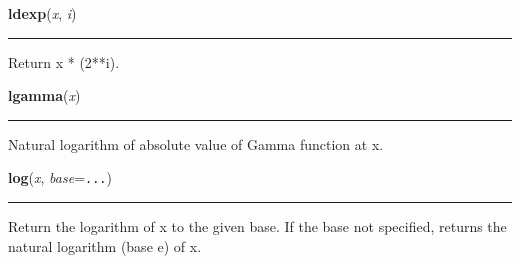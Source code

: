     \label{math:ldexp}

    \vspace{0.5ex}

\hspace{.8\funcindent}\begin{boxedminipage}{\funcwidth}

    \raggedright \textbf{ldexp}(\textit{x}, \textit{i})

    \vspace{-1.5ex}

    \rule{\textwidth}{0.5\fboxrule}
\setlength{\parskip}{2ex}
    Return x * (2**i).

\setlength{\parskip}{1ex}
    \end{boxedminipage}

    \label{math:lgamma}

    \vspace{0.5ex}

\hspace{.8\funcindent}\begin{boxedminipage}{\funcwidth}

    \raggedright \textbf{lgamma}(\textit{x})

    \vspace{-1.5ex}

    \rule{\textwidth}{0.5\fboxrule}
\setlength{\parskip}{2ex}
    Natural logarithm of absolute value of Gamma function at x.

\setlength{\parskip}{1ex}
    \end{boxedminipage}

    \label{math:log}

    \vspace{0.5ex}

\hspace{.8\funcindent}\begin{boxedminipage}{\funcwidth}

    \raggedright \textbf{log}(\textit{x}, \textit{base}={\tt ...})

    \vspace{-1.5ex}

    \rule{\textwidth}{0.5\fboxrule}
\setlength{\parskip}{2ex}
    Return the logarithm of x to the given base. If the base not specified,
    returns the natural logarithm (base e) of x.

\setlength{\parskip}{1ex}
    \end{boxedminipage}

